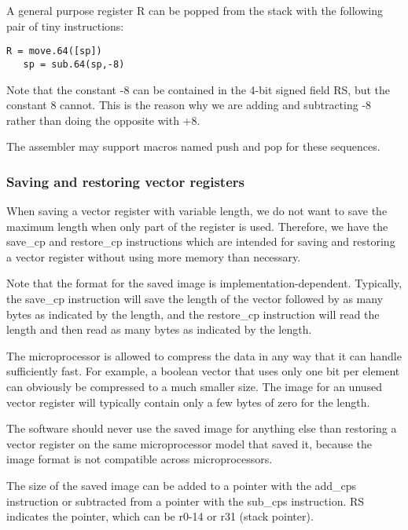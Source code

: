 \documentclass[forwardcom.tex]{subfiles}
\begin{document}
A general purpose register R can be popped from the stack with the following pair of tiny instructions:

\begin{lstlisting}[frame=none]
   R = move.64([sp])
   sp = sub.64(sp,-8)
\end{lstlisting}

Note that the constant -8 can be contained in the 4-bit signed field RS, but the constant 8 cannot. This is the reason why we are adding and subtracting -8 rather than doing the opposite with +8.
\vspace{2mm}

The assembler may support macros named push and pop for these sequences.

\subsubsection{Saving and restoring vector registers} \label{saveRestoreVectorRegisters}
When saving a vector register with variable length, we do not want to save the maximum length when only part of the register is used. Therefore, we have the save\_cp and restore\_cp instructions which are intended for saving and restoring a vector register without using more memory than necessary.
\vspace{2mm}

Note that the format for the saved image is implementation-dependent. Typically, the save\_cp instruction will save the length of the vector followed by as many bytes as indicated by the length, and the restore\_cp instruction will read the length and then read as many bytes as indicated by the length. 
\vspace{2mm}

The microprocessor is allowed to compress the data in any way that it can handle sufficiently fast. For example, a boolean vector that uses only one bit per element can obviously be compressed to a much smaller size. The image for an unused vector register will typically contain only a few bytes of zero for the length.
\vspace{2mm}

The software should never use the saved image for anything else than restoring a vector register on the same microprocessor model that saved it, because the image format is not compatible across microprocessors.
\vspace{2mm}

The size of the saved image can be added to a pointer with the add\_cps instruction or subtracted from a pointer with the sub\_cps instruction. RS indicates the pointer, which can be r0-14 or r31 (stack pointer).
\vspace{2mm}
\end{document}
